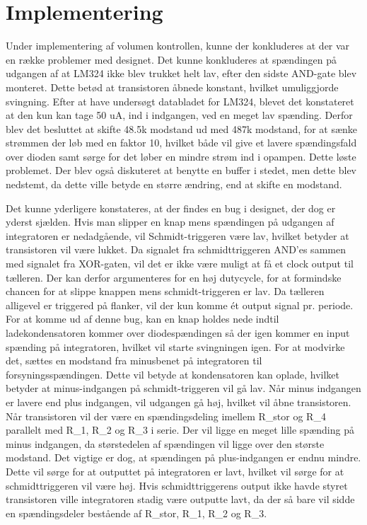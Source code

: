 \section{Implementering}
Under implementering af volumen kontrollen, kunne der konkluderes at der var en række problemer med designet. Det kunne konkluderes at spændingen på udgangen af at LM324 ikke blev trukket helt lav, efter den sidste AND-gate blev monteret. Dette betød at transistoren åbnede konstant, hvilket umuliggjorde svingning. Efter at have undersøgt databladet for LM324, blevet det konstateret at den kun kan tage 50 uA, ind i indgangen, ved en meget lav spænding. Derfor blev det besluttet at skifte 48.5k modstand ud med 487k modstand, for at sænke strømmen der løb med en faktor 10, hvilket både vil give et lavere spændingsfald over dioden samt sørge for det løber en mindre strøm ind i opampen. Dette løste problemet. Der blev også diskuteret at benytte en buffer i stedet, men dette blev nedstemt, da dette ville betyde en større ændring, end at skifte en modstand.

Det kunne yderligere konstateres, at der findes en bug i designet, der dog er yderst sjælden. Hvis man slipper en knap mens spændingen på udgangen af integratoren er nedadgående, vil Schmidt-triggeren være lav, hvilket betyder at transistoren vil være lukket. Da signalet fra schmidttriggeren AND'es sammen med signalet fra XOR-gaten, vil det er ikke være muligt at få et clock output til tælleren. Der kan derfor argumenteres for en høj dutycycle, for at formindske chancen for at slippe knappen mens schmidt-triggeren er lav. Da tælleren alligevel er triggered på flanker, vil der kun komme ét output signal pr. periode. For at komme ud af denne bug, kan en knap holdes nede indtil ladekondensatoren kommer over diodespændingen så der igen kommer en input spænding på integratoren, hvilket vil starte svingningen igen. 
For at modvirke det, sættes en modstand fra minusbenet på integratoren til forsyningsspændingen. Dette vil betyde at kondensatoren kan oplade, hvilket betyder at minus-indgangen på schmidt-triggeren vil gå lav. Når minus indgangen er lavere end plus indgangen, vil udgangen gå høj, hvilket vil åbne transistoren. Når transistoren vil der være en spændingsdeling imellem R_stor og R_4 parallelt med R_1, R_2 og R_3 i serie. Der vil ligge en meget lille spænding på minus indgangen, da størstedelen af spændingen vil ligge over den største modstand. Det vigtige er dog, at spændingen på plus-indgangen er endnu mindre. Dette vil sørge for at outputtet på integratoren er lavt, hvilket vil sørge for at schmidttriggeren vil være høj. Hvis schmidttriggerens output ikke havde styret transistoren ville integratoren stadig være outputte lavt, da der så bare vil sidde en spændingsdeler bestående af R_stor, R_1, R_2 og R_3.